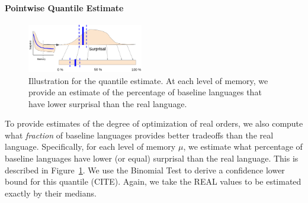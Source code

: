 



\paragraph{Pointwise Quantile Estimate}


\begin{figure}
	\begin{center}
\includegraphics[width=0.45\textwidth]{figures/quantile.png}
\end{center}
	\caption{Illustration for the quantile estimate. At each level of memory, we provide an estimate of the percentage of baseline languages that have lower surprisal than the real language.}\label{fig:quantile-pointwise}
\end{figure}

To provide estimates of the degree of optimization of real orders, we also compute what \emph{fraction} of baseline languages provides better tradeoffs than the real language.
Specifically, for each level of memory $\mu$, we estimate what percentage of baseline languages have lower (or equal) surprisal than the real language.
This is described in Figure~\ref{fig:quantile-pointwise}.
We use the Binomial Test to derive a confidence lower bound for this quantile (CITE).
Again, we take the REAL values to be estimated exactly by their medians.

%
%
%




